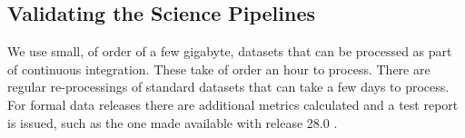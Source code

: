\subsection{Validating the Science Pipelines}
\label{sec:validation}

We use small, of order of a few gigabyte, datasets that can be processed as part of continuous integration.
These take of order an hour to process.
There are regular re-processings of standard datasets that can take a few days to process.
For formal data releases there are additional metrics calculated and a test report is issued, such as the one made available with release 28.0 \citep{DMTR-451}.


